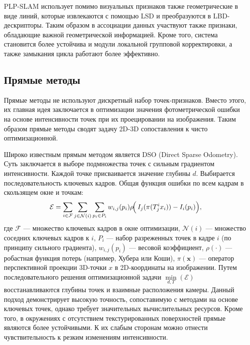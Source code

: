 PLP-SLAM использует помимо визуальных признаков также геометрические в виде линий,
которые извлекаются с помощью LSD и преобразуются в LBD-дескрипторы. Таким образом
в ассоциации данных участвуют также признаки, обладающие важной геометрической информацией.
Кроме того, система становится более устойчива и модули локальной групповой корректировки, а также
замыкания цикла работают более эффективно.


\subsection{Прямые методы}
Прямые методы не используют дискретный набор точек-признаков. Вместо этого, их главная
идея заключается в оптимизации значения фотометрической ошибки на основе интенсивности точек при их проецировании на изображения. 
Таким образом прямые методы сводят задачу 2D-3D сопоставления к чисто оптимизационной.


Широко известным прямым методом является DSO (Direct Sparse Odometry). Суть заключается
в выборе подмножества точек с сильным градиентом интенсивности. Каждой точке 
присваивается значение глубины $d$. Выбирается последовательность ключевых кадров.
Общая функция ошибки по всем кадрам в скользящем окне и точкам:
\begin{equation}
    \mathcal{E} = 
    \sum_{i \in \mathcal{F}} \sum_{j \in \mathcal{N}(i)} 
    \sum_{{p}_i \in P_i}
    w_{i,j}({p}_i) \rho\!\Bigl(\,
    I_j(\pi({T}_j^i {x}_i)) - I_i({p}_i)
    \Bigr),
\end{equation}
где  $\mathcal{F}$ --- множество ключевых кадров в окне оптимизации, $\mathcal{N}(i)$ ---
множество соседних ключевых кадров к $i$, $P_i$ --- набор разреженных 
точек в кадре $i$ (по принципу сильного градиента), $w_{i,j}({p}_i)$ --- 
весовой коэффициент, $\rho(\cdot)$ --- робастная функция потерь (например, 
Хубера или Коши), $\pi(\mathbf{x})$ --- оператор перспективной проекции 
3D-точки $x$ в 2D-координаты на изображении. Путем последовательного решения оптимизационной
задачи $\min\limits_{d, T}(\mathcal{E})$ восстанавливаются глубины точек и взаимные расположения 
камеры. Данный подход демонстрирует высокую точность, сопоставимую с
методами на основе ключевых точек, однако требует значительных вычислительных ресурсов.
Кроме того, в окружениях с отсутствием текстурированных поверхностей прямые являются
более устойчивыми. К их слабым сторонам можно отнести чувствительность к резким изменениям интенсивности.

